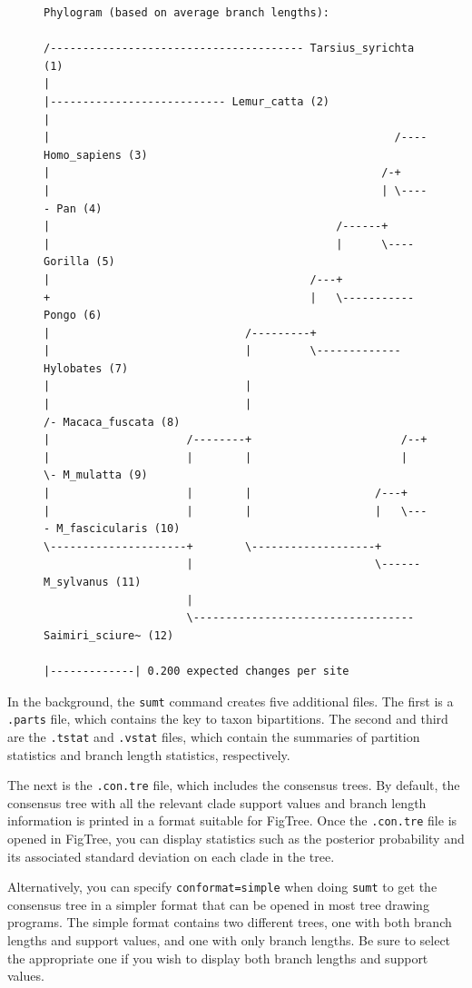 \documentclass[12pt]{book}
\begin{document}
\begin{figure}[H]
\centering
\begin{BVerbatim}[fontsize=\scriptsize]
Phylogram (based on average branch lengths):

/--------------------------------------- Tarsius_syrichta (1)
|
|--------------------------- Lemur_catta (2)
|
|                                                     /---- Homo_sapiens (3)
|                                                   /-+
|                                                   | \----- Pan (4)
|                                            /------+
|                                            |      \---- Gorilla (5)
|                                        /---+
+                                        |   \----------- Pongo (6)
|                              /---------+
|                              |         \------------- Hylobates (7)
|                              |
|                              |                          /- Macaca_fuscata (8)
|                     /--------+                       /--+
|                     |        |                       |  \- M_mulatta (9)
|                     |        |                   /---+
|                     |        |                   |   \---- M_fascicularis (10)
\---------------------+        \-------------------+
                      |                            \------ M_sylvanus (11)
                      |
                      \---------------------------------- Saimiri_sciure~ (12)

|-------------| 0.200 expected changes per site
\end{BVerbatim}
\end{figure}

In the background, the \texttt{sumt} command creates five additional files. The first is a
\texttt{.parts} file, which contains the key to taxon bipartitions. The second and third are the
\texttt{.tstat} and \texttt{.vstat} files, which contain the summaries of partition statistics and
branch length statistics, respectively.

The next is the \texttt{.con.tre} file, which includes the consensus trees. By default, the
consensus tree with all the relevant clade support values and branch length information is printed
in a format suitable for FigTree. Once the \texttt{.con.tre} file is opened in FigTree, you can
display statistics such as the posterior probability and its associated standard deviation on each
clade in the tree.

Alternatively, you can specify \texttt{conformat=simple} when doing \texttt{sumt} to get the
consensus tree in a simpler format that can be opened in most tree drawing programs. The simple
format contains two different trees, one with both branch lengths and support values, and one with
only branch lengths. Be sure to select the appropriate one if you wish to display both branch
lengths and support values.
\end{document}
